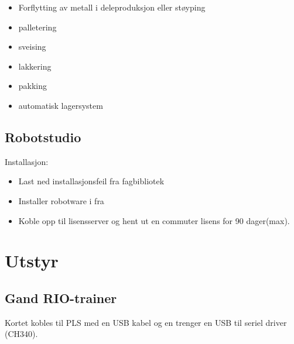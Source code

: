 \documentclass[10pt,a5paper]{article}
\begin{document}
\begin{itemize}[noitemsep]
\item Forflytting av metall i deleproduksjon eller støyping
\item palletering
\item sveising
\item lakkering
\item pakking
\item automatisk lagersystem
\end{itemize}
\vfil  \eject
\subsection{Robotstudio}

Installasjon:
\begin{itemize}[noitemsep]
	\item Last ned installasjonsfeil fra fagbibliotek
	\item Installer robotware i fra
	\item Koble opp til lisensserver og hent ut en commuter lisens for 90 dager(max).
\end{itemize}











\section{Utstyr}
\subsection{Gand RIO-trainer}

Kortet kobles til PLS med en USB kabel og en trenger en USB til seriel
driver (CH340). 
\end{document}
